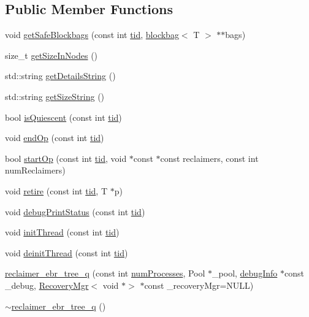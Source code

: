 \subsection*{Public Member Functions}
\begin{DoxyCompactItemize}
\item 
void \hyperlink{classreclaimer__ebr__tree__q_a20c18f89048520313881e48aea56d346}{get\+Safe\+Blockbags} (const int \hyperlink{microbench_2main_8cpp_a9ca9869868fe7e7a38a921cc7de4103f}{tid}, \hyperlink{classblockbag}{blockbag}$<$ T $>$ $\ast$$\ast$bags)
\item 
size\+\_\+t \hyperlink{classreclaimer__ebr__tree__q_a7dd15de4e2b702ddcc726beb6f5aea03}{get\+Size\+In\+Nodes} ()
\item 
std\+::string \hyperlink{classreclaimer__ebr__tree__q_a8a13b84deb3016f4bfb45d375e15c4dd}{get\+Details\+String} ()
\item 
std\+::string \hyperlink{classreclaimer__ebr__tree__q_ad7b69190f8e24214be11b3d90c6380e4}{get\+Size\+String} ()
\item 
bool \hyperlink{classreclaimer__ebr__tree__q_acf02fbff03a0e5fff1e98b6457d77c20}{is\+Quiescent} (const int \hyperlink{microbench_2main_8cpp_a9ca9869868fe7e7a38a921cc7de4103f}{tid})
\item 
void \hyperlink{classreclaimer__ebr__tree__q_ad9a87e180ec41534381c80939c94f0aa}{end\+Op} (const int \hyperlink{microbench_2main_8cpp_a9ca9869868fe7e7a38a921cc7de4103f}{tid})
\item 
bool \hyperlink{classreclaimer__ebr__tree__q_a87abaab7960fab864deaff4e6f358996}{start\+Op} (const int \hyperlink{microbench_2main_8cpp_a9ca9869868fe7e7a38a921cc7de4103f}{tid}, void $\ast$const $\ast$const reclaimers, const int num\+Reclaimers)
\item 
void \hyperlink{classreclaimer__ebr__tree__q_a0232028c4b878f2907442b41cbf73218}{retire} (const int \hyperlink{microbench_2main_8cpp_a9ca9869868fe7e7a38a921cc7de4103f}{tid}, T $\ast$p)
\item 
void \hyperlink{classreclaimer__ebr__tree__q_a6a2106ba8affb3ae0935418868d995ce}{debug\+Print\+Status} (const int \hyperlink{microbench_2main_8cpp_a9ca9869868fe7e7a38a921cc7de4103f}{tid})
\item 
void \hyperlink{classreclaimer__ebr__tree__q_a7859d179c8baa22752d8da9287e49580}{init\+Thread} (const int \hyperlink{microbench_2main_8cpp_a9ca9869868fe7e7a38a921cc7de4103f}{tid})
\item 
void \hyperlink{classreclaimer__ebr__tree__q_a38c74a41409a6e2ba6f67ec19c6e49cf}{deinit\+Thread} (const int \hyperlink{microbench_2main_8cpp_a9ca9869868fe7e7a38a921cc7de4103f}{tid})
\item 
\hyperlink{classreclaimer__ebr__tree__q_ac0243334db596ecc7d41834656cdd59c}{reclaimer\+\_\+ebr\+\_\+tree\+\_\+q} (const int \hyperlink{testing_8cpp_aa085812188e21ede75351d88b9b2c30d}{num\+Processes}, Pool $\ast$\+\_\+pool, \hyperlink{classdebugInfo}{debug\+Info} $\ast$const \+\_\+debug, \hyperlink{classRecoveryMgr}{Recovery\+Mgr}$<$ void $\ast$$>$ $\ast$const \+\_\+recovery\+Mgr=N\+U\+LL)
\item 
\hyperlink{classreclaimer__ebr__tree__q_a983350ea3cd56b26073a8c0f688b6c33}{$\sim$reclaimer\+\_\+ebr\+\_\+tree\+\_\+q} ()
\end{DoxyCompactItemize}
